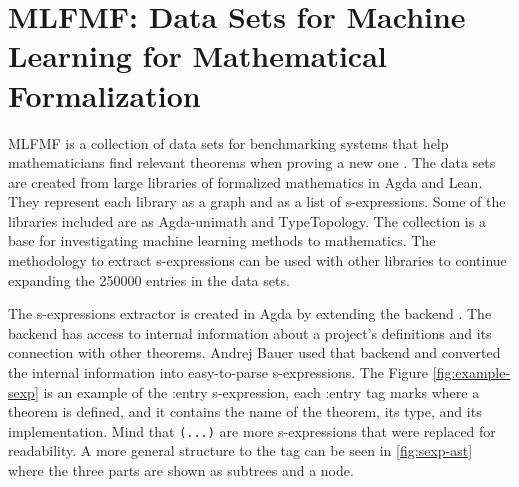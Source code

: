 \section{MLFMF: Data Sets for Machine Learning for Mathematical Formalization}

MLFMF is a collection of data sets for benchmarking systems that help
mathematicians find relevant theorems when proving a new one
\cite{bauer2023mlfmf}. The data sets are created from large libraries of
formalized mathematics in Agda and Lean. They represent each library as a graph
and as a list of s-expressions. Some of the libraries included are as
Agda-unimath and TypeTopology. The collection is a base for investigating
machine learning methods to mathematics. The methodology to extract
s-expressions can be used with other libraries to continue expanding the 250000
entries in the data sets.

The s-expressions extractor is created in Agda by extending the backend
\cite{andrej}. The backend has access to internal information about a project's
definitions and its connection with other theorems. Andrej Bauer used that
backend and converted the internal information into easy-to-parse
s-expressions. The Figure \cref{fig:example-sexp} is an example of the
\textsf{:entry} s-expression, each \textsf{:entry} tag marks where a theorem is
defined, and it contains the name of the theorem, its type, and its
implementation. Mind that \texttt{(...)} are more s-expressions that were
replaced for readability. A more general structure to the tag can be seen in
\cref{fig:sexp-ast} where the three parts are shown as subtrees and a node.

